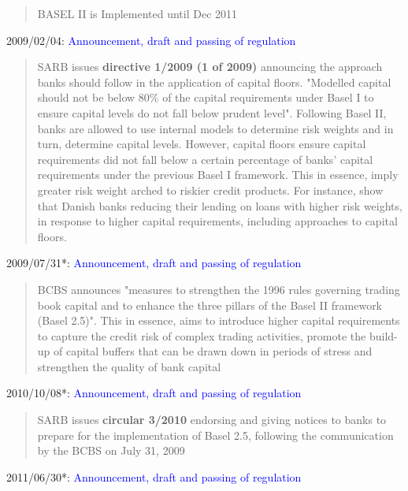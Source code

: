 \documentclass[
  letterpaper,
  DIV=11,
  numbers=noendperiod]{scrartcl}
\begin{document}
\begin{quote}
            BASEL II is  Implemented until Dec 2011

\end{quote}

2009/02/04:
\textcolor{blue}{Announcement, draft and passing of regulation}

\begin{quote}
SARB issues  \textbf{directive 1/2009 (1 of 2009)} announcing the approach banks should follow in the application of capital floors. "Modelled capital should not be below 80\% of the capital requirements under Basel I to ensure capital levels do not fall below prudent level". Following Basel II, banks are allowed to use internal models to determine risk weights and in turn, determine capital levels. However, capital floors ensure capital requirements did not fall below a certain percentage of banks’ capital requirements under the previous Basel I framework\citep{basel06}. This in essence, imply greater risk weight arched to riskier credit products. For instance,  \cite{imbierowicz2018time} show that Danish banks reducing their lending on loans with higher risk weights, in response to higher capital requirements, including approaches to capital floors.
\end{quote}

2009/07/31*:
\textcolor{blue}{Announcement, draft and passing of regulation}

\begin{quote}BCBS announces "measures to strengthen the 1996 rules governing trading book capital and to enhance the three pillars of the Basel II framework (Basel 2.5)". This in essence, aims  to introduce higher capital requirements to capture the credit risk of complex trading activities, promote the build-up of capital buffers that can be drawn down in periods of stress and strengthen the quality of bank capital\citep{basel09}
\end{quote}

2010/10/08*:
\textcolor{blue}{Announcement, draft and passing of regulation}

\begin{quote}SARB issues \textbf{circular 3/2010} endorsing and giving notices to banks to prepare for the implementation of Basel 2.5, following the communication by the BCBS on July 31, 2009
\end{quote}

2011/06/30*:
\textcolor{blue}{Announcement, draft and passing of regulation}
\end{document}
